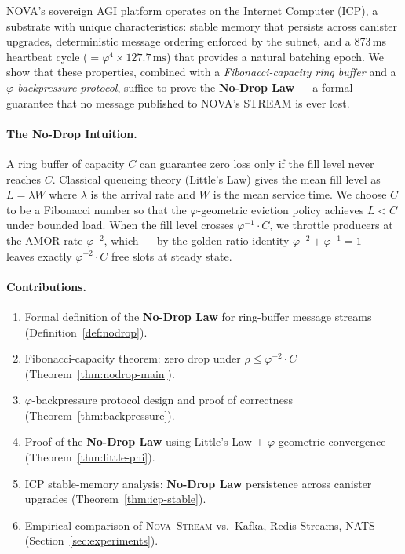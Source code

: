 \documentclass[12pt]{article}
\newcommand{\PHI}{\varphi}
\newcommand{\PHIINV}{\varphi^{-1}}
\newcommand{\AMOR}{\varphi^{-2}}
\newcommand{\Stream}{\textsc{Nova~Stream}}
\newcommand{\SCAP}{C}
\newcommand{\load}{\rho}
\newcommand{\NoDrop}{\textbf{No-Drop Law}}
\begin{document}
NOVA's sovereign AGI platform operates on the Internet Computer (ICP), a
substrate with unique characteristics: stable memory that persists across canister
upgrades, deterministic message ordering enforced by the subnet, and a 873\,ms
heartbeat cycle ($= \PHI^4 \times 127.7\,\mathrm{ms}$) that provides a natural
batching epoch.  We show that these properties, combined with a
\emph{Fibonacci-capacity ring buffer} and a \emph{$\varphi$-backpressure
protocol}, suffice to prove the \NoDrop{} — a formal guarantee that no message
published to NOVA's STREAM is ever lost.

\paragraph{The No-Drop Intuition.}
A ring buffer of capacity $\SCAP$ can guarantee zero loss only if the fill level
never reaches $\SCAP$.  Classical queueing theory (Little's Law) gives the mean
fill level as $L = \lambda W$ where $\lambda$ is the arrival rate and $W$ is the
mean service time.  We choose $\SCAP$ to be a Fibonacci number so that the
$\varphi$-geometric eviction policy achieves $L < \SCAP$ under bounded load.
When the fill level crosses $\PHIINV \cdot \SCAP$, we throttle producers at the
AMOR rate $\AMOR$, which — by the golden-ratio identity $\AMOR + \PHIINV = 1$ —
leaves exactly $\AMOR \cdot \SCAP$ free slots at steady state.

\paragraph{Contributions.}
\begin{enumerate}[label=(\roman*)]
  \item Formal definition of the \NoDrop{} for ring-buffer message streams
        (Definition~\ref{def:nodrop}).
  \item Fibonacci-capacity theorem: zero drop under $\load \le \AMOR \cdot \SCAP$
        (Theorem~\ref{thm:nodrop-main}).
  \item $\varphi$-backpressure protocol design and proof of correctness
        (Theorem~\ref{thm:backpressure}).
  \item Proof of the \NoDrop{} using Little's Law + $\varphi$-geometric
        convergence (Theorem~\ref{thm:little-phi}).
  \item ICP stable-memory analysis: \NoDrop{} persistence across canister
        upgrades (Theorem~\ref{thm:icp-stable}).
  \item Empirical comparison of \Stream{} vs.\ Kafka, Redis Streams, NATS
        (Section~\ref{sec:experiments}).
\end{enumerate}
\end{document}
